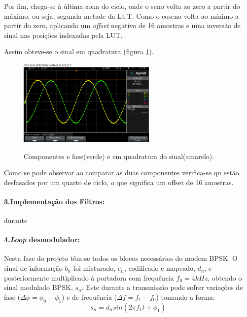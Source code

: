 \documentclass[11pt]{article}
\numberwithin{equation}{section}
\begin{document}
Por fim, chega-se à última zona do ciclo, onde o seno volta ao zero a partir do máximo, ou seja, segunda metade da LUT. Como o coseno volta ao mínimo a partir do zero, aplicando um \textit{offset} negativo de 16 amostras e uma inversão de sinal nas posições indexadas pela LUT.

Assim obteve-se o sinal em quadratura (figura \ref{quad}).
\begin{figure}[h]
	\centering     
	\includegraphics[width=0.6\textwidth]{./quadratura}~\\
	\caption{Componentes e fase(verde) e em quadratura do sinal(amarelo).}
	\label{quad}
\end{figure}

Como se pode observar ao comparar as duas componentes verifica-se qu estão desfasados por um quarto de ciclo, o que significa um offset de 16 amostras.
\paragraph{3.Implementação dos Filtros:} \hspace{0pt}   \label{para:P3-3}       durante

\paragraph{4.\textit{Loop} desmodulador:} \hspace{0pt}
   \label{para:P3-4}

Nesta fase do projeto têm-se todos os blocos necessários do modem BPSK. O sinal de informação $b_n$ foi misturado, $e_n$, codificado e mapeado, $d_n$, e posteriormente multiplicado à portadora com frequência $f_0 = 4kHz$, obtendo o sinal modulado BPSK, $s_n$. Este durante a transmissão pode sofrer variações de fase ($\Delta\phi=\phi_0-\phi_1$) e de frequência ($\Delta f = f_1-f_0$) tomando a forma:
\begin{equation}
	s_n=d_nsin(2\pi f_1t+ \phi_1)
\end{equation}
\end{document}
